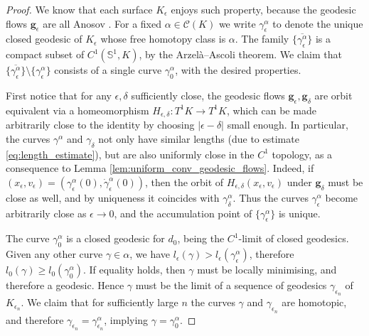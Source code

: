 \documentclass[reqno,11pt]{amsart}
\begin{document}
\begin{proof}
    We know that each surface \( K_\epsilon \) enjoys such property, because the geodesic flows \( \mathbf{g}_\epsilon \) are all Anosov \cite{klingenberg_riemannian_1974}.
    For a fixed \( \alpha \in \mathcal{C}(K) \) we write \( \gamma_\epsilon^\alpha\) to denote the unique closed geodesic of \( K_\epsilon \) whose free homotopy class is \( \alpha \).
    The family \( \overline{\{\gamma^\alpha_\epsilon\}} \) is a compact subset of \( C^1(\mathbb{S}^1, K) \), by the Arzelà–Ascoli theorem.
    We claim that \( \overline{\{\gamma^\alpha_\epsilon\}}\setminus\{\gamma^\alpha_\epsilon\} \) consists of a single curve \( \gamma^\alpha_0\), with the desired properties.
    \par First notice that for any \( \epsilon, \delta \) sufficiently close, the geodesic flows \( \mathbf{g}_\epsilon, \mathbf{g}_\delta \) are orbit equivalent via a homeomorphism \( H_{\epsilon, \delta}\colon T^1K \to T^1K \), which can be made arbitrarily close to the identity by choosing \( |\epsilon - \delta| \) small enough.
    In particular, the curves \( \gamma^\alpha \) and \( \gamma_\delta \) not only have similar lengths (due to estimate \eqref{eq:length_estimate}), but are also uniformly close in the \( C^1 \) topology, as a consequence to Lemma \ref{lem:uniform_conv_geodesic_flows}.
    Indeed, if \( (x_\epsilon, v_\epsilon) = (\gamma^\alpha_\epsilon(0), \dot\gamma^\alpha_\epsilon(0)) \), then the orbit of \( H_{\epsilon, \delta}(x_\epsilon, v_\epsilon) \) under \( \mathbf{g}_\delta \) must be close as well, and by uniqueness it coincides with \( \gamma^\alpha_\delta\).
    Thus the curves \( \gamma^\alpha_\epsilon \) become arbitrarily close as \( \epsilon \to 0\), and the accumulation point of \(\{\gamma^\alpha_\epsilon\}\) is unique.
    \par The curve \( \gamma^\alpha_0 \) is a closed geodesic for \( d_0 \), being the \(C^1\)-limit of closed geodesics. 
    Given any other curve \( \gamma \in \alpha \), we have \( l_\epsilon(\gamma) > l_\epsilon(\gamma^\alpha_\epsilon) \), therefore \( l_0(\gamma) \geq l_0(\gamma^\alpha_0)\).
    If equality holds, then \( \gamma \) must be locally minimising, and therefore a geodesic. 
    Hence \( \gamma \) must be the limit of a sequence of geodesics \( \gamma_{\epsilon_n} \) of \( K_{\epsilon_n} \).
    We claim that for sufficiently large \( n \) the curves \( \gamma \) and \( \gamma_{\epsilon_n} \) are homotopic, and therefore \( \gamma_{\epsilon_n} = \gamma^\alpha_{\epsilon_n} \), implying \( \gamma = \gamma^\alpha_0 \).

\end{proof}
\end{document}
